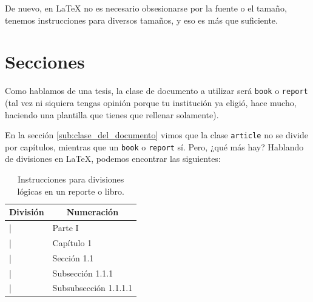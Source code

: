 De nuevo, en \LaTeX{} no es necesario obsesionarse por la fuente o el tamaño, tenemos instrucciones para diversos tamaños, y eso es más que suficiente.



\section{Secciones}
\label{sec:secciones}



Como hablamos de una tesis, la clase de documento a utilizar será \texttt{book} o \texttt{report} (tal vez ni siquiera tengas opinión porque tu institución ya eligió, hace mucho, haciendo una plantilla que tienes que rellenar solamente).

En la sección \ref{sub:clase_del_documento} vimos que la clase \texttt{article} no se divide por capítulos, mientras que un \texttt{book} o \texttt{report} sí. Pero, ¿qué más hay? Hablando de divisiones en \LaTeX{}, podemos encontrar las siguientes:

\begin{table}[ht!]
\centering
\begin{tabular}{ll}
\hline
\multicolumn{1}{c}{\textbf{División}}     & \multicolumn{1}{c}{\textbf{Numeración}} \\
\hline
|\part|          & Parte I                        \\
|\chapter|       & Capítulo 1                     \\
|\section|       & Sección 1.1                    \\
|\subsection|    & Subsección 1.1.1               \\
|\subsubsection| & Subsubsección 1.1.1.1          \\
\hline
\end{tabular}
\caption{Instrucciones para divisiones lógicas en un reporte o libro.} %
\label{tab:instrucciones_de_secciones}
\end{table}

